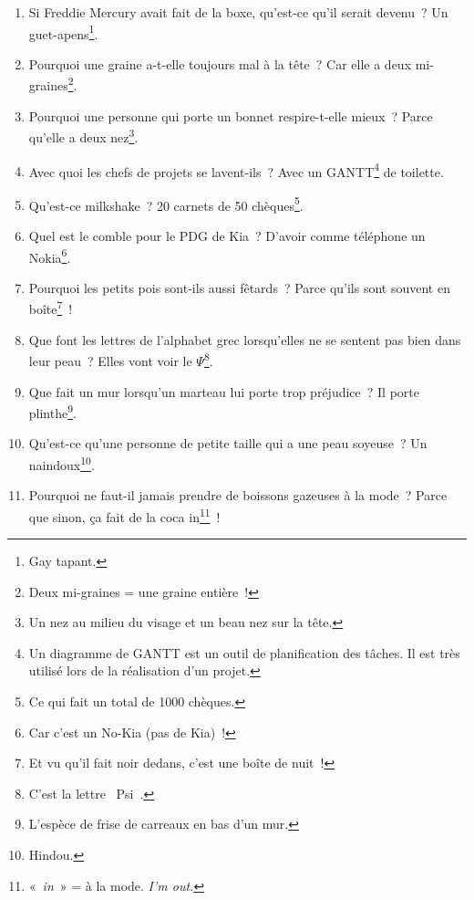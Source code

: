 \documentclass[10pt,a5paper,fullpage]{book}
\begin{document}
\begin{enumerate}
		\item Si Freddie Mercury avait fait de la boxe, qu’est-ce qu’il serait devenu~? Un guet-apens\footnote{Gay tapant.}.
		\item Pourquoi une graine a-t-elle toujours mal à la tête~? Car elle a deux mi-graines\footnote{Deux mi-graines = une graine entière~!}.
		\item Pourquoi une personne qui porte un bonnet respire-t-elle mieux~? Parce qu’elle a deux nez\footnote{Un nez au milieu du visage et un beau nez sur la tête.}.
		\item Avec quoi les chefs de projets se lavent-ils~? Avec un GANTT\footnote{Un diagramme de GANTT est un outil de planification des tâches. Il est très utilisé lors de la réalisation d’un projet.} de toilette.  
		\item Qu’est-ce milkshake~? 20 carnets de 50 chèques\footnote{Ce qui fait un total de 1000 chèques.}.
		\item Quel est le comble pour le PDG de Kia~? D’avoir comme téléphone un Nokia\footnote{Car c'est un No-Kia (pas de Kia)~!}.
		\item Pourquoi les petits pois sont-ils aussi fêtards~? Parce qu'ils sont souvent en boîte\footnote{Et vu qu’il fait noir dedans, c’est une boîte de nuit~!}~!
		\item Que font les lettres de l’alphabet grec lorsqu’elles ne se sentent pas bien dans leur peau~? Elles vont voir le $\Psi$\footnote{C'est la lettre \guillemotleft~Psi~\guillemotright.}.
		\item Que fait un mur lorsqu’un marteau lui porte trop préjudice~? Il porte plinthe\footnote{L’espèce de frise de carreaux en bas d’un mur. }.
		\item Qu’est-ce qu’une personne de petite taille qui a une peau soyeuse~? Un naindoux\footnote{Hindou.}.
		\item Pourquoi ne faut-il jamais prendre de boissons gazeuses à la mode~? Parce que sinon, ça fait de la coca in\footnote{« \textit{in} » = à la mode. \textit{I'm out.}}~!

\end{enumerate}
\end{document}
